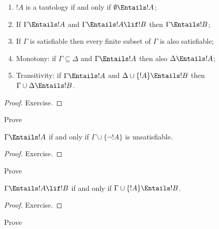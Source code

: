 \documentclass[../../../include/open-logic-section]{subfiles}
\begin{document}
\begin{prop}
\begin{enumerate} 
\item $!A$ is a tautology if and only if
  $\emptyset \Entails !A$; 
\item If $\Gamma \Entails !A$ and $\Gamma \Entails !A \lif !B$ then
  $\Gamma \Entails !B$;
\item If $\Gamma$ is satisfiable then every finite subset of $\Gamma$
  is also satisfiable; 
\item {} Monotony: if $\Gamma \subseteq \Delta$
  and $\Gamma \Entails !A$ then also $\Delta \Entails !A$;
\item {} Transitivity: if $\Gamma \Entails !A$ and
  $\Delta \cup \{ !A\} \Entails !B$ then $\Gamma \cup \Delta \Entails
  !B$.
\end{enumerate}
\end{prop}

\begin{proof}
Exercise.
\end{proof}

\begin{prob}
Prove 
\end{prob}

\begin{prop}
  $\Gamma \Entails !A$ if and only if $\Gamma \cup \{\lnot !A\}$
  is unsatisfiable.
\end{prop}

\begin{proof}
Exercise.
\end{proof}

\begin{prob}
Prove 
\end{prob}

\begin{thm}
   $\Gamma \Entails !A \lif !B$ if and only
  if $\Gamma \cup \{!A\} \Entails !B$.
\end{thm}

\begin{proof}
Exercise.
\end{proof}

\begin{prob}
Prove 
\end{prob}
\end{document}
